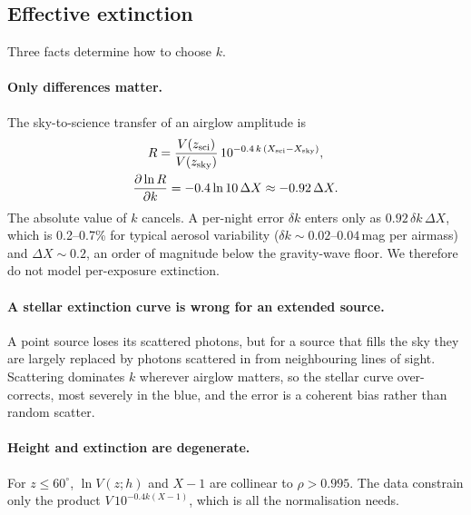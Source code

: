 \subsection{Effective extinction}
\label{sec:extinction}

Three facts determine how to choose $k$.

\paragraph{Only differences matter.} The sky-to-science transfer of an
airglow amplitude is
\begin{equation}
\begin{gathered}
  R = \frac{V(z_{\rm sci})}{V(z_{\rm sky})}\,10^{-0.4\,k\,(X_{\rm sci}-X_{\rm sky})},\\
  \frac{\partial\ln R}{\partial k} = -0.4\ln10\,\Delta X \approx -0.92\,\Delta X .
\end{gathered}
\end{equation}
The absolute value of $k$ cancels. A per-night error $\delta k$ enters only
as $0.92\,\delta k\,\Delta X$, which is 0.2--0.7\% for typical aerosol
variability ($\delta k\sim0.02$--$0.04$\,mag per airmass) and
$\Delta X\sim0.2$, an order of magnitude below the gravity-wave floor. We
therefore do not model per-exposure extinction.

\paragraph{A stellar extinction curve is wrong for an extended source.}
A point source loses its scattered photons, but for a source that fills the
sky they are largely replaced by photons scattered in from neighbouring
lines of sight. Scattering dominates $k$ wherever airglow matters, so the
stellar curve over-corrects, most severely in the blue, and the error is a
coherent bias rather than random scatter.

\paragraph{Height and extinction are degenerate.} For $z\le60^\circ$,
$\ln V(z;h)$ and $X-1$ are collinear to $\rho>0.995$. The data constrain only
the product $V\,10^{-0.4k(X-1)}$, which is all the normalisation needs.

